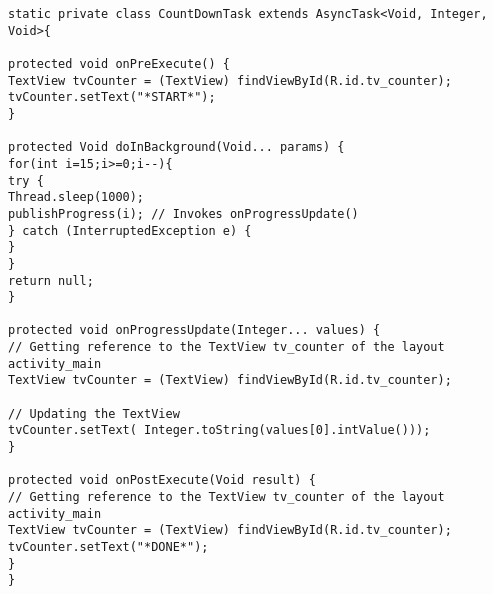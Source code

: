 \begin{lstlisting}
static private class CountDownTask extends AsyncTask<Void, Integer, Void>{

protected void onPreExecute() {
TextView tvCounter = (TextView) findViewById(R.id.tv_counter);
tvCounter.setText("*START*");
}

protected Void doInBackground(Void... params) {
for(int i=15;i>=0;i--){
try {
Thread.sleep(1000);
publishProgress(i); // Invokes onProgressUpdate()
} catch (InterruptedException e) {
}
}
return null;
}

protected void onProgressUpdate(Integer... values) {
// Getting reference to the TextView tv_counter of the layout activity_main
TextView tvCounter = (TextView) findViewById(R.id.tv_counter);

// Updating the TextView 
tvCounter.setText( Integer.toString(values[0].intValue()));			
}

protected void onPostExecute(Void result) {
// Getting reference to the TextView tv_counter of the layout activity_main
TextView tvCounter = (TextView) findViewById(R.id.tv_counter);
tvCounter.setText("*DONE*");			
}		
}
\end{lstlisting}

